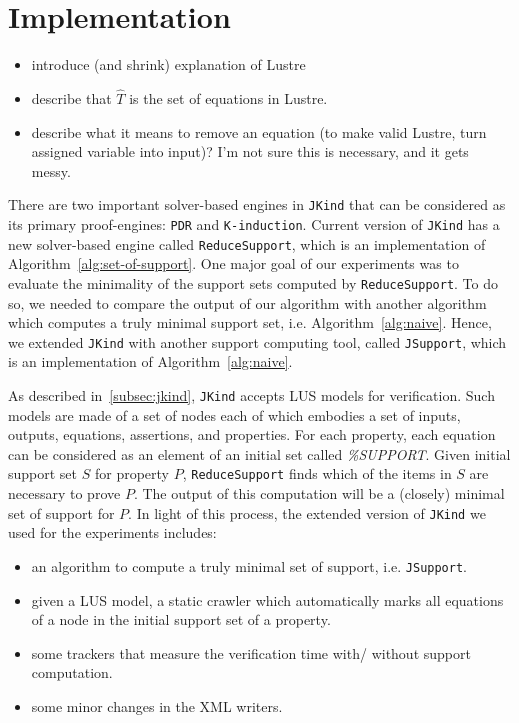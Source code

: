 \section{Implementation}
\label{sec:impl}

\begin{itemize}
    \item introduce (and shrink) explanation of Lustre
    \item describe that $\widehat T$ is the set of equations in Lustre.
    \item describe what it means to remove an equation (to make valid Lustre, 
        turn assigned variable into input)?  I'm not sure this is necessary, and it 
        gets messy.
\end{itemize}

There are two important solver-based engines in \texttt{JKind} that can be considered as its primary proof-engines: \texttt{PDR} and \texttt{K-induction}. Current version of \texttt{JKind} has a new solver-based engine called \texttt{ReduceSupport},
which is an implementation of Algorithm~\ref{alg:set-of-support}.
One major goal of our experiments was to evaluate the minimality of the support sets computed by \texttt{ReduceSupport}.
To do so, we needed to compare the output of our algorithm with another algorithm
which computes a truly minimal support set, i.e. Algorithm~\ref{alg:naive}. Hence, we extended \texttt{JKind}
with another support computing tool, called \texttt{JSupport}, which is an implementation of Algorithm~\ref{alg:naive}.

As described in~\ref{subsec:jkind}, \texttt{JKind} accepts LUS models for verification.
Such models are made of a set of nodes each of which embodies a set of inputs, outputs, equations, assertions, and properties. For each property, each equation can be considered as an element of an initial set called \textit{\%SUPPORT}. Given initial support set $S$ for property $P$, \texttt{ReduceSupport} finds which of the items in $S$ are necessary to prove $P$. The output of this computation will be a (closely) minimal set of support for $P$. In light of this process, the extended version of \texttt{JKind} we used for the experiments includes:

\begin{itemize}
    \item an algorithm to compute a truly minimal set of support, i.e. \texttt{JSupport}.
    \item given a LUS model, a static crawler which automatically marks all equations of a node in the initial support set of a property.
    \item some trackers that measure the verification time with/ without support computation.
    \item some minor changes in the XML writers.
\end{itemize}
